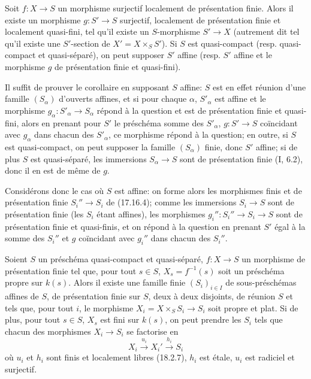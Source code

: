 
\begin{corollary}[17.16.5]
\label{IV.17.16.5}
Soit $f:X\to S$ un morphisme surjectif localement de présentation finie. Alors il existe un morphisme $g:S'\to S$ surjectif, localement de présentation finie et localement quasi-fini, tel qu'il existe un $S$-morphisme $S'\to X$ (autrement dit tel qu'il existe une $S'$-section de $X'=X\times_S S'$). Si $S$ est quasi-compact (resp. quasi-compact et quasi-séparé), on peut supposer $S'$ affine (resp. $S'$ affine et le morphisme $g$ de présentation finie et quasi-fini).
\end{corollary}

Il suffit de prouver le corollaire en supposant $S$ affine: $S$ est en effet réunion d'une famille $(S_\alpha)$ d'ouverts affines, et si pour chaque $\alpha$, $S'_\alpha$ est affine et le morphisme $g_\alpha:S'_\alpha\to S_\alpha$ répond à la question et est de présentation finie et quasi-fini, alors en prenant pour $S'$ le préschéma somme des $S'_\alpha$, $g:S'\to S$ coïncidant avec $g_\alpha$ dans chacun des $S'_\alpha$, ce morphisme répond à la question; en outre, si $S$ est quasi-compact, on peut supposer la famille $(S_\alpha)$ finie, donc $S'$ affine; si de plus $S$ est quasi-séparé, les immersions $S_\alpha\to S$ sont de présentation finie (I, 6.2), donc il en est de même de $g$.

Considérons donc le cas où $S$ est affine: on forme alors les morphismes finis et de présentation finie $S_i''\to S_i$ de (17.16.4); comme les immersions $S_i\to S$ sont de présentation finie (les $S_i$ étant affines), les morphismes $g_i'':S_i''\to S_i\to S$ sont de présentation finie et quasi-finis, et on répond à la question en prenant $S'$ égal à la somme des $S_i''$ et $g$ coïncidant avec $g_i''$ dans chacun des $S_i''$.

\begin{proposition}[17.16.6]
\label{IV.17.16.6}
Soient $S$ un préschéma quasi-compact et quasi-séparé, $f:X\to S$ un morphisme de présentation finie tel que, pour tout $s\in S$, $X_s=f^{-1}(s)$ soit un préschéma propre sur $k(s)$. Alors il existe une famille finie $(S_i)_{i\in I}$ de sous-préschémas affines de $S$, de présentation finie sur $S$, deux à deux disjoints, de réunion $S$ et tels que, pour tout $i$, le morphisme $X_i=X\times_S S_i\to S_i$ soit propre et plat. Si de plus, pour tout $s\in S$, $X_s$ est fini sur $k(s)$, on peut prendre les $S_i$ tels que chacun des morphismes $X_i\to S_i$ se factorise en
\[
  X_i\xrightarrow{u_i}X_i'\xrightarrow{h_i}S_i
\]
où $u_i$ et $h_i$ sont finis et localement libres (18.2.7), $h_i$ est étale, $u_i$ est radiciel et surjectif.
\end{proposition}

